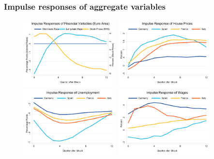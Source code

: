 \documentclass[pdflatex,aspectratio=169]{beamer}
\begin{document}
\begin{frame}\frametitle{\bf Impulse responses of aggregate variables}
\begin{figure}
\begin{center}
\includegraphics[width=0.45\textwidth]{./figures/irf_fin}
\includegraphics[width=0.45\textwidth]{./figures/irf_HP}\\
\includegraphics[width=0.45\textwidth]{./figures/irf_UR}
\includegraphics[width=0.45\textwidth]{./figures/irf_W}
\end{center}
\end{figure}

\end{frame}
\end{document}
